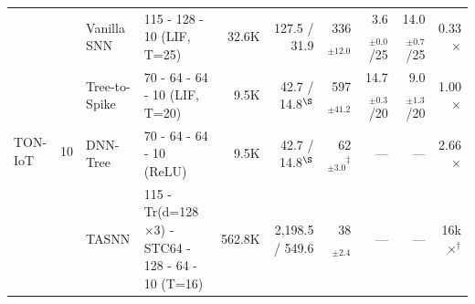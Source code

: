 \begin{table}[!ht]
{\begin{tabular}{l c l l r r r r r r}
\midrule
\multirow{4}{*}{TON-IoT} & \multirow{4}{*}{10}
  & Vanilla SNN   & 115 - 128 - 10 (LIF, T=25) & 32.6K & 127.5 / 31.9 & 336$_{\pm12.0}$ & 3.6$_{\pm0.0}$/25 & 14.0$_{\pm0.7}$/25 & 0.33$\times$ \\
& & Tree-to-Spike & 70 - 64 - 64 - 10 (LIF, T=20) & 9.5K & 42.7 / 14.8$^{\S}$ & 597$_{\pm41.2}$ & 14.7$_{\pm0.3}$/20 & 9.0$_{\pm1.3}$/20 & 1.00$\times$ \\
& & DNN-Tree      & 70 - 64 - 64 - 10 (ReLU) & 9.5K & 42.7 / 14.8$^{\S}$ & 62$_{\pm3.0}$$^\ddagger$ & --- & --- & 2.66$\times$ \\
& & TASNN         & 115 - Tr(d=128$\times$3) - STC64 - 128 - 64 - 10 (T=16) & 562.8K & 2,198.5 / 549.6 & 38$_{\pm2.4}$ & --- & --- & 16k$\times$$^\dagger$ \\
\bottomrule
\end{tabular}}
\end{table}
